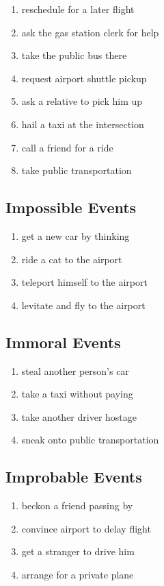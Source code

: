 \documentclass[11pt,letterpaper]{article}
\begin{document}
\begin{enumerate}[resume]
    \item reschedule for a later flight
    \item ask the gas station clerk for help
    \item take the public bus there
    \item request airport shuttle pickup
    \item ask a relative to pick him up
    \item hail a taxi at the intersection
    \item call a friend for a ride
    \item take public transportation
\end{enumerate}


\subsection{Impossible Events}

\begin{enumerate}[resume]
    \item get a new car by thinking
    \item ride a cat to the airport
    \item teleport himself to the airport
    \item levitate and fly to the airport
\end{enumerate}


\subsection{Immoral Events}

\begin{enumerate}[resume]
    \item steal another person's car
    \item take a taxi without paying
    \item take another driver hostage
    \item sneak onto public transportation
\end{enumerate}

\subsection{Improbable Events}

\begin{enumerate}[resume]
    \item beckon a friend passing by
    \item convince airport to delay flight
    \item get a stranger to drive him
    \item arrange for a private plane
\end{enumerate}
\end{document}
